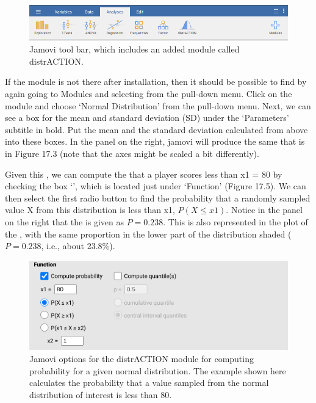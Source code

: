 \documentclass[
  openany]{krantz}
\begin{document}
\begin{figure}
\includegraphics[width=1\linewidth]{img/jamovi_toolbar_modules_distrACTION} \caption{Jamovi tool bar, which includes an added module called distrACTION.}\label{fig:unnamed-chunk-69}
\end{figure}

\newpage

If the module is not there after installation, then it should be possible to find by again going to Modules and selecting  from the pull-down menu.
Click on the module and choose `Normal Distribution' from the pull-down menu.
Next, we can see a box for the mean and standard deviation (SD) under the `Parameters' subtitle in bold.
Put the mean and the standard deviation calculated from above into these boxes.
In the panel on the right, jamovi will produce the same  that is in Figure 17.3 (note that the axes might be scaled a bit differently).

Given this , we can compute the  that a player scores less than x1 = 80 by checking the box `', which is located just under `Function' (Figure 17.5).
We can then select the first radio button to find the probability that a randomly sampled value X from this distribution is less than x1, \(P(X \leq x1)\).
Notice in the panel on the right that the  is given as \(P = 0.238\).
This is also represented in the plot of the , with the same proportion in the lower part of the distribution shaded (\(P = 0.238\), i.e., about 23.8\%).

\begin{figure}
\includegraphics[width=1\linewidth]{img/jamovi_normal_distribution} \caption{Jamovi options for the distrACTION module for computing probability for a given normal distribution. The example shown here calculates the probability that a value sampled from the normal distribution of interest is less than 80.}\label{fig:unnamed-chunk-70}
\end{figure}
\end{document}
